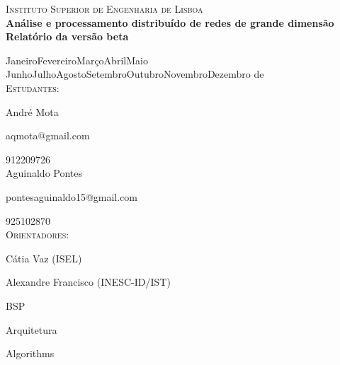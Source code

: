 \documentclass[a4paper,10pt]{report}
\begin{document}
\clearpage

\vskip0.5cm                
\begin{center}
  {\LARGE \textsc{Instituto Superior de Engenharia de Lisboa}}
  \\[1cm]
  {\huge \bf Análise e processamento distribuído de redes de grande dimensão}
  \\[0.5cm]
  {\large {\bf Relatório da versão beta}}
  
  {\large
    \ifcase\month\or Janeiro\or Fevereiro\or Março\or Abril\or Maio\or
      Junho\or Julho\or Agosto\or Setembro\or Outubro\or Novembro\or Dezembro
    \fi
    \space de\space\the\year}
    \\[0.5cm]
    \textsc{Estudantes:}
    
    André Mota
    
    aqmota@gmail.com
    
    912209726
    \\[0.25cm]
    Aguinaldo Pontes
    
    pontesaguinaldo15@gmail.com
    
    925102870
    \\[0.5cm]
    \textsc{Orientadores:}
    
    Cátia Vaz (ISEL)
    
    Alexandre Francisco (INESC-ID/IST)

\end{center}

\clearpage
{}

\tableofcontents







{BSP}

{Arquitetura}


{Algorithms}





\end{document}

